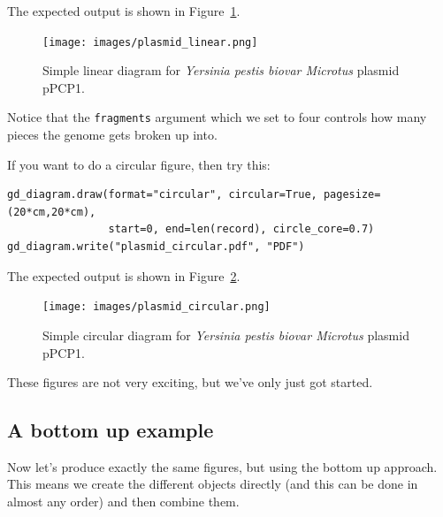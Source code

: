 \documentclass{report}
\begin{document}
\begin{htmlonly}

\end{htmlonly}
\begin{latexonly}
The expected output is shown in Figure~\ref{fig:plasmid_linear}.
\begin{figure}[htbp]
\centering
\texttt{[image: images/plasmid\_linear.png]}
\caption{Simple linear diagram for \textit{Yersinia pestis biovar Microtus} plasmid pPCP1.}
\label{fig:plasmid_linear}
\end{figure}
\end{latexonly}
Notice that the \verb|fragments| argument which we set to four controls how
many pieces the genome gets broken up into.

If you want to do a circular figure, then try this:

\begin{verbatim}
gd_diagram.draw(format="circular", circular=True, pagesize=(20*cm,20*cm),
                start=0, end=len(record), circle_core=0.7)
gd_diagram.write("plasmid_circular.pdf", "PDF")
\end{verbatim}

\begin{htmlonly}

\end{htmlonly}
\begin{latexonly}
The expected output is shown in Figure~\ref{fig:plasmid_circular}.
\begin{figure}[htbp]
\centering
\texttt{[image: images/plasmid\_circular.png]}
\caption{Simple circular diagram for \textit{Yersinia pestis biovar Microtus} plasmid pPCP1.}
\label{fig:plasmid_circular}
\end{figure}
\end{latexonly}
These figures are not very exciting, but we've only just got started.

\subsection{A bottom up example}
Now let's produce exactly the same figures, but using the bottom up approach.
This means we create the different objects directly (and this can be done in
almost any order) and then combine them.
\end{document}
